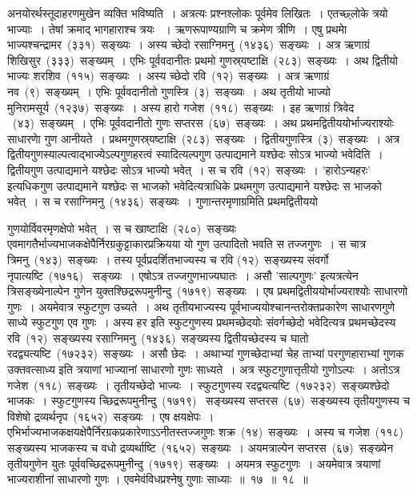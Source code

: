 \documentclass[11pt, openany]{book}
\begin{document}
\indent
अनयोरर्थस्तूदाहरणमुखेन व्यक्ति भविष्यति~। अत्रत्यः प्रश्नश्लोकः पूर्वमेव लिखितः~। एतच्छ्लोके त्रयो भाज्याः~। तेषां क्रमाद् भागहाराश्च त्रयः ~। ऋणरूपाण्यग्राणि च क्रमेण त्रीणि~। एषु प्रथमाे भाज्यश्चन्द्रामर~(३३१)~सङ्ख्यः~। अस्य च्छेदो रसाग्निमनु~(१४३६)~सङ्ख्यः~। अत्र ऋणाग्रं शिखिसुर~(३३३)~सङ्ख्यम्~। एभिः पूर्ववदानीतः प्रथमो गुणस्र्यष्टाक्षि~(२८३)~सङ्ख्यः~। अथ द्वितीयो भाज्यः शरशिव~(११५)~सङ्ख्यः~। अस्य च्छेदो रवि~(१२)~सङ्ख्यः~। अत्र ऋणाग्रं नव~(९)~सङ्ख्यम्~। एभिः पूर्ववदानीतो गुणस्त्रि~(३)~सङ्ख्यः~। अथ तृतीयो भाज्यो मुनिरामसूर्य~(१२३७)~सङ्ख्यः~। अस्य हारो गजेश~(११८)~सङ्ख्यः~। इह ऋणाग्रं त्रिवेद ~(४३)~सङ्ख्यम्~। एभिः पूर्ववदानीतो गुणः सप्तरस~(६७)~सङ्ख्यः~। अथ प्रथमद्वितीययोर्भाज्यराश्योः  साधारणाे गुण आनीयते~। प्रथमगुणस्र्यष्टाक्षि~(२८३)~सङ्ख्यः~। द्वितीयगुणस्त्रि~(३)~सङ्ख्यः~। अत्र द्वितीयगुणस्याल्पत्वाद्भाज्येऽल्पगुणहरत्वं स्यादित्यल्पगुण उत्पाद्यमाने यश्छेदः सोऽत्र भाज्यो भवेदिति~। द्वितीयगुण उत्पाद्यमाने यश्छेदः सोऽत्र भाज्यो भवेत्~। स च रवि~(१२)~सङ्ख्यः~। 'हारोऽन्यहरः' इत्यधिकगुण उत्पाद्यमाने यश्छेदः स भाजको भवेदित्यत्राधिके प्रथमगुण उत्पाद्यमाने यश्छेदः स भाजको भवेत्~। स च रसाग्निमनु~(१४३६)~सङ्ख्यः~। गुणान्तरमृणाग्रमिति प्रथमद्वितीययो\textendash

\newpage
\thispagestyle{fancy}
\fancyhf{}
\noindent
गुणयोर्विवरमृणक्षेपो भवेत्~। स च खाष्टाक्षि~(२८०)~सङ्ख्यः~ एवमागतैर्भाज्यभाजकक्षेपैर्निरग्रकुट्टाकारप्रक्रियया यो गुण उत्पादितो भवति स तज्जगुणः~। स चात्र त्रिमनु~(१४३)~सङ्ख्यः~। तस्य पूर्वप्रदर्शितभाज्यस्य च रवि (१२)~सङ्ख्यस्य संवर्गो नृपात्यष्टि~(१७१६)~ सङ्ख्यः~। एषोऽत्र तज्जगुणभाज्यघातः~। असौ 'साल्पगुणः' इत्यत्रत्येन त्रिसङ्ख्येनाल्पेन गुणेन युक्तश्छिद्ररूपमुनीन्दु~(१७१९)~सङ्ख्यः~। एष प्रथमद्वितीययोर्भाज्यराश्योः साधारणो गुणः~। अयमेवात्र स्फुटगुण उच्यते~। अथ तृतीयभाज्यस्य पूर्वभाज्ययोश्चानन्तरोक्तप्रकारेण साधारणगुणे साध्ये स्फुटगुण एव गुणः~। अस्य हर इति स्फुटगुणस्य प्रथमच्छेदयोः संवर्गच्छेदो भवेदित्यत्र प्रथमच्छेदस्य रवि~(१२)~सङ्ख्यस्य रसाग्निमनु~(१४३६)~सङ्ख्यस्य द्वितीयच्छेदस्य च घातो रदद्व्यत्यष्टि~(१७२३२)~सङ्ख्यः~। असौ छेदः~। अथाभ्यां गुणच्छेदाभ्यां चेह ताभ्यां परगुणहाराभ्यां गुणक उक्तवत्साध्य इति त्रयाणां भाज्यानां साधारणो गुणः साध्यते~। अत्र स्फुटगुणात्तृतीयो गुणोऽल्पः~। अतोऽत्र गजेश~(११८)~सङ्ख्यः~। तृतीयच्छेदो भाज्यः~। स्फुटगुणस्य रदद्व्यत्यष्टि~(१७२३२)~सङ्ख्यश्छेदो भाजकः~। स्फुटगुणस्य च्छिद्ररूपमुनीन्दु~(१७१९)~
सङ्ख्यस्य सप्तरस~(६७)~सङ्ख्यस्य तृतीयगुणस्य च विशेषो द्रव्यर्थनृप~(१६५२)~सङ्ख्यः~। एष क्षयक्षेपः~। एभिर्भाज्यभाजकक्षयक्षेपैर्निरग्रकप्रकारेणाऽऽनीतस्तज्जगुणः शक्र~(१४)~सङ्ख्यः~। अस्य च गजेश~(११८)~ सङ्ख्यस्य भाजकस्य च वधो द्रव्यर्थाष्टि~(१६५२)~सङ्ख्यः~। अयमत्राल्पेन सप्तरस~(६७)~सङ्ख्येन तृतीयगुणेन युतः पूर्ववच्छिद्ररूपमुनीन्दु~(१७१९)~सङ्ख्यः~। अयमत्र स्फुटगुणः~। अयमेवात्र त्रयाणां भाज्यराशीनां साधारणो गुणः । एवमेवंविधप्रश्नेषु गुणाः साध्याः~॥~१७~॥~१८~॥\\
\end{document}
